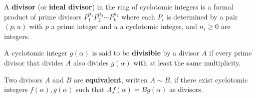 A \textbf{divisor} (or \textbf{ideal divisor}) in the ring of cyclotomic integers is a formal product of prime divisors $P_1^{n_1}P_2^{n_2}\cdots P_k^{n_k}$ where each $P_i$ is determined by a pair $(p, u)$ with $p$ a prime integer and $u$ a cyclotomic integer, and $n_i \geq 0$ are integers.

A cyclotomic integer $g(\alpha)$ is said to be \textbf{divisible} by a divisor $A$ if every prime divisor that divides $A$ also divides $g(\alpha)$ with at least the same multiplicity.

Two divisors $A$ and $B$ are \textbf{equivalent}, written $A \sim B$, if there exist cyclotomic integers $f(\alpha), g(\alpha)$ such that $Af(\alpha) = Bg(\alpha)$ as divisors.
